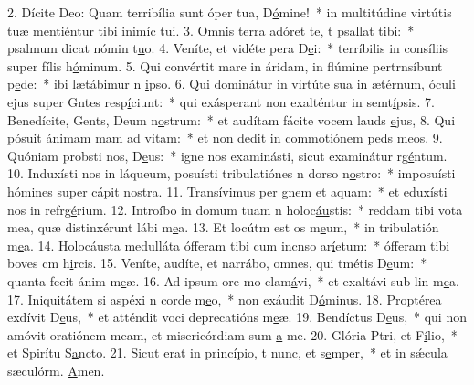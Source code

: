 2. Dícite Deo: Quam terribília sunt óper tua, D\uline{ó}mine!~* in multitúdine virtútis tuæ mentiéntur tibi inimíc t\uline{u}i.
3. Omnis terra adóret te, t psallat t\uline{i}bi:~* psalmum dicat nómin t\uline{u}o.
4. Veníte, et vidéte pera D\uline{e}i:~* terríbilis in consíliis super fílis h\uline{ó}minum.
5. Qui convértit mare in áridam, in flúmine pertrnsíbunt p\uline{e}de:~* ibi lætábimur n \uline{i}pso.
6. Qui dominátur in virtúte sua in ætérnum, óculi ejus super Gntes resp\uline{í}ciunt:~* qui exásperant non exalténtur in semt\uline{í}psis.
7. Benedícite, Gents, Deum n\uline{o}strum:~* et audítam fácite vocem lauds \uline{e}jus,
8. Qui pósuit ánimam mam ad v\uline{i}tam:~* et non dedit in commotiónem peds m\uline{e}os.
9. Quóniam probsti nos, D\uline{e}us:~* igne nos examinásti, sicut examinátur rg\uline{é}ntum.
10. Induxísti nos in láqueum, posuísti tribulatiónes n dorso n\uline{o}stro:~* imposuísti hómines super cápit n\uline{o}stra.
11. Transívimus per gnem et \uline{a}quam:~* et eduxísti nos in refrg\uline{é}rium.
12. Introíbo in domum tuam n holoc\uline{áu}stis:~* reddam tibi vota mea, quæ distinxérunt lábi m\uline{e}a.
13. Et locútm est os m\uline{e}um,~* in tribulatión m\uline{e}a.
14. Holocáusta medulláta ófferam tibi cum incnso ar\uline{í}etum:~* ófferam tibi boves cm h\uline{i}rcis.
15. Veníte, audíte, et narrábo, omnes, qui tmétis D\uline{e}um:~* quanta fecit ánim m\uline{e}æ.
16. Ad ipsum ore mo clam\uline{á}vi,~* et exaltávi sub lin m\uline{e}a.
17. Iniquitátem si aspéxi n corde m\uline{e}o,~* non exáudit D\uline{ó}minus.
18. Proptérea exdívit D\uline{e}us,~* et atténdit voci deprecatións m\uline{e}æ.
19. Bendíctus D\uline{e}us,~* qui non amóvit oratiónem meam, et misericórdiam sum \uline{a} me.
20. Glória Ptri, et F\uline{í}lio,~* et Spirítu S\uline{a}ncto.
21. Sicut erat in princípio, t nunc, et s\uline{e}mper,~* et in sǽcula sæculórm. \uline{A}men.
